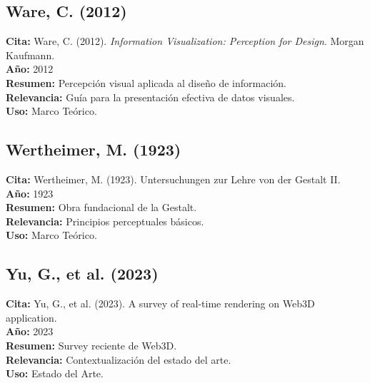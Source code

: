 \subsection*{Ware, C. (2012)}
\textbf{Cita:} Ware, C. (2012). \textit{Information Visualization: Perception for Design}. Morgan Kaufmann. \\
\textbf{Año:} 2012 \\
\textbf{Resumen:} Percepción visual aplicada al diseño de información. \\
\textbf{Relevancia:} Guía para la presentación efectiva de datos visuales. \\
\textbf{Uso:} Marco Teórico.

\subsection*{Wertheimer, M. (1923)}
\textbf{Cita:} Wertheimer, M. (1923). Untersuchungen zur Lehre von der Gestalt II. \\
\textbf{Año:} 1923 \\
\textbf{Resumen:} Obra fundacional de la Gestalt. \\
\textbf{Relevancia:} Principios perceptuales básicos. \\
\textbf{Uso:} Marco Teórico.

\subsection*{Yu, G., et al. (2023)}
\textbf{Cita:} Yu, G., et al. (2023). A survey of real-time rendering on Web3D application. \\
\textbf{Año:} 2023 \\
\textbf{Resumen:} Survey reciente de Web3D. \\
\textbf{Relevancia:} Contextualización del estado del arte. \\
\textbf{Uso:} Estado del Arte.
